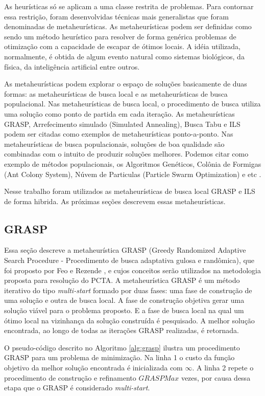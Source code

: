 As heurísticas só se aplicam a uma classe restrita de problemas. Para contornar essa restrição, foram desenvolvidas técnicas mais generalistas que foram denominadas de metaheurísticas. As metaheurísticas podem ser definidas como sendo um método heurístico para resolver de forma genérica problemas de otimização com a capacidade de escapar de ótimos locais. A idéia utilizada, normalmente, é obtida de algum evento natural como sistemas biológicos, da física, da inteligência artificial entre outros.

As metaheurísticas podem explorar o espaço de soluções basicamente de duas formas: as metaheurísticas de busca local e as metaheurísticas de busca populacional. Nas metaheurísticas de busca local, o procedimento de busca utiliza uma solução como ponto de partida em cada iteração. As metaheurísticas GRASP, Arrefecimento simulado (Simulated Annealing), Busca Tabu e ILS podem ser citadas como exemplos de metaheurísticas ponto-a-ponto. Nas metaheurísticas de busca populacionais, soluções de boa qualidade são combinadas com o intuito de produzir soluções melhores. Podemos citar como exemplo de métodos populacionais, os Algoritmos Genéticos, Colônia de Formigas (Ant Colony System), Núvem de Particulas (Particle Swarm Optimization) e etc \cite{maritan2009}.

Nesse trabalho foram utilizados as metaheurísticas de busca local GRASP e ILS de forma hibrida. As próximas seções descrevem essas metaheurísticas.

\subsection{GRASP}

Essa seção descreve a metaheurística GRASP (Greedy Randomized Adaptive Search Procedure - Procedimento de busca adaptativa gulosa e randômica), que foi proposto por Feo e Rezende \cite{resende1995}, e cujos conceitos serão utilizados na metodologia proposta para resolução do PCTA.
A metaheurística GRASP é um método iterativo do tipo \textit{multi-start} formado por duas fases: uma fase de construção de uma solução e outra de busca local. A fase de construção objetiva gerar uma solução viável para o problema proposto. E a fase de busca local na qual um ótimo local na vizinhança da solução construída é pesquisado. A melhor solução encontrada, ao longo de todas as iterações GRASP realizadas, é retornada.

O pseudo-código descrito no Algoritmo \ref{alg:grasp} ilustra um procedimento GRASP para um problema de minimização. Na linha 1 o custo da função objetivo da melhor solução encontrada é inicializada com $\infty$. A linha 2 repete o procedimento de construção e refinamento $GRASPMax$ vezes, por causa dessa etapa que o GRASP é considerado \textit{multi-start}.

